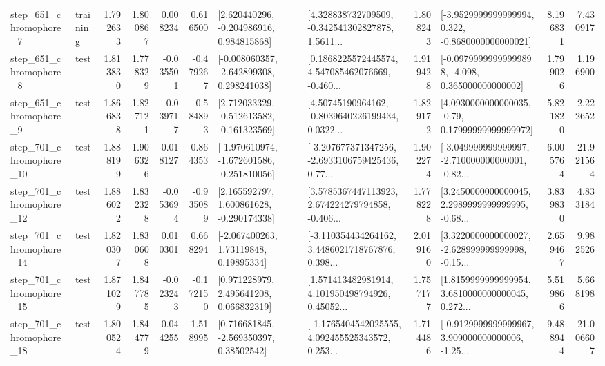 \begin{tabular}{llrrrrllrlrr}
   step\_651\_chromophore\_7 &  training &      1.792633 &    1.800867 &      0.008234 &  0.616500 &    [2.620440296, -0.204986916, 0.984815868] &  [4.328838732709509, -0.342541302827878, 1.5611... &       1.808243 &  [-3.9529999999999994, 0.322, -0.8680000000000021] &            8.196831 &          7.430917 \\
   step\_651\_chromophore\_8 &      test &      1.813830 &    1.778329 &     -0.035501 & -0.479267 &   [-0.008060357, -2.642899308, 0.298241038] &  [0.1868225572445574, 4.547085462076669, -0.460... &       1.919428 &  [-0.09799999999999898, -4.098, 0.365000000000002] &            1.799026 &          1.196900 \\
   step\_651\_chromophore\_9 &      test &      1.866838 &    1.827121 &     -0.039717 & -0.584893 &   [2.712033329, -0.512613582, -0.161323569] &  [4.50745190964162, -0.8039640226199434, 0.0322... &       1.829172 &   [4.0930000000000035, -0.79, 0.17999999999999972] &            5.821820 &          2.222652 \\
  step\_701\_chromophore\_10 &      test &      1.888199 &    1.906326 &      0.018127 &  0.864353 &  [-1.970610974, -1.672601586, -0.251810056] &  [-3.207677371347256, -2.6933106759425436, 0.77... &       1.902274 &  [-3.049999999999997, -2.710000000000001, -0.82... &            6.005764 &         21.921564 \\
  step\_701\_chromophore\_12 &      test &      1.886022 &    1.832328 &     -0.053694 & -0.935089 &    [2.165592797, 1.600861628, -0.290174338] &  [3.5785367447113923, 2.674224279794858, -0.406... &       1.778228 &  [3.2450000000000045, 2.2989999999999995, -0.68... &            3.839830 &          4.833184 \\
  step\_701\_chromophore\_14 &      test &      1.820307 &    1.830608 &      0.010301 &  0.668294 &      [-2.067400263, 1.73119848, 0.19895334] &  [-3.110354434264162, 3.4486021718767876, 0.398... &       2.019160 &  [3.3220000000000027, -2.628999999999998, -0.15... &            2.659467 &          9.982526 \\
  step\_701\_chromophore\_15 &      test &      1.871029 &    1.847785 &     -0.023243 & -0.172150 &     [0.971228979, 2.495641208, 0.066832319] &  [1.571413482981914, 4.101950498794926, 0.45052... &       1.757177 &  [1.8159999999999954, 3.6810000000000045, 0.272... &            5.519866 &          5.668198 \\
  step\_701\_chromophore\_18 &      test &      1.800524 &    1.844779 &      0.044255 &  1.518995 &     [0.716681845, -2.569350397, 0.38502542] &  [-1.1765404542025555, 4.092455525343572, 0.253... &       1.714486 &  [-0.9129999999999967, 3.909000000000006, -1.25... &            9.488944 &         21.006607 \\

\end{tabular}
